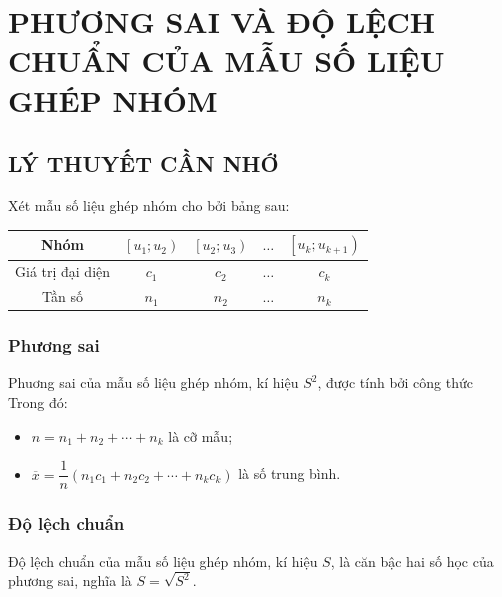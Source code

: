 \section{PHƯƠNG SAI VÀ ĐỘ LỆCH CHUẨN CỦA MẪU SỐ LIỆU GHÉP NHÓM}
\subsection{LÝ THUYẾT CẦN NHỚ}
	Xét mẫu số liệu ghép nhóm cho bởi bảng sau:
\begin{center}
	\begin{tabular}{|c|c|c|c|c|}
		\hline Nhóm &{$\left[u_1; u_2\right)$} &{$\left[u_2; u_3\right)$} & $\ldots$ &{$\left[u_k; u_{k+1}\right)$} \\
		\hline Giá trị đại diện & $c_1$ & $c_2$ & $\ldots$ & $c_k$ \\
		\hline Tần số & $n_1$ & $n_2$ & $\ldots$ & $n_k$ \\
		\hline
	\end{tabular}
\end{center}
\subsubsection{Phương sai}
Phuơng sai của mẫu số liệu ghép nhóm, kí hiệu $S^2$, được tính bởi công thức
Trong đó: 
\begin{itemize}
	\item [\iconCH] $n=n_1+n_2+\cdots+n_k$ là cỡ mẫu;
	\item [\iconCH] $\overline{x}=\dfrac{1}{n}\left(n_1 c_1+n_2 c_2+\cdots+n_k c_k\right)$ là số trung bình.
\end{itemize}
\subsubsection{Độ lệch chuẩn}
Độ lệch chuẩn của mẫu số liệu ghép nhóm, kí hiệu $S$, là căn bậc hai số học của phương sai, nghĩa là $S=\sqrt{S^2}$.

